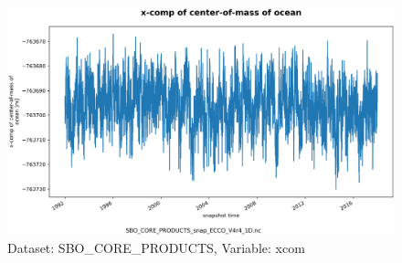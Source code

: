 \begin{figure}[H]
\centering
\includegraphics[scale=0.55]{../images/plots/oneD_plots/SBO_Core_Products/xcom.png}
\caption{Dataset: SBO\_CORE\_PRODUCTS, Variable: xcom}
\label{tab:table-SBO_CORE_PRODUCTS_xcom-Plot}
\end{figure}
\pagebreak
